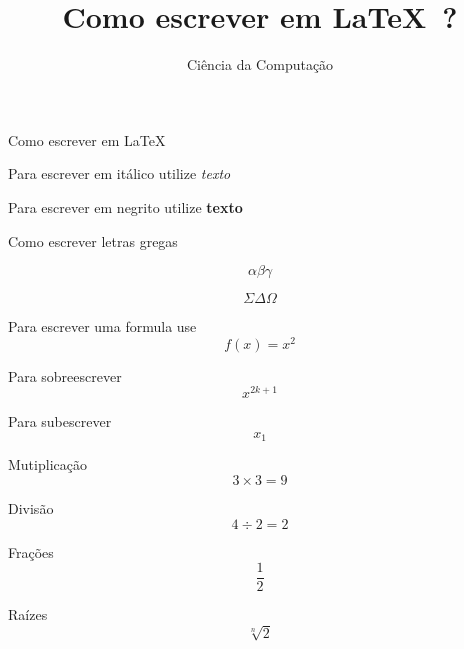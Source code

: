 \documentclass[a4paper,12pt]{article}
\title{Como escrever em \LaTeX\ ?}
\author{Ciência da Computação}
\date{}
\begin{document}
\maketitle

Como escrever em \LaTeX\ 

Para escrever em itálico utilize \textit {texto}

Para escrever em negrito utilize \textbf {texto}

Como escrever letras gregas

\[\alpha \beta \gamma \] 

\[ \Sigma \Delta \Omega \]

Para escrever uma formula use 
\[f(x)= x^2\]


Para sobreescrever   
\[x^{2k+1}\]

Para subescrever 
\[x_1\]

Mutiplicação 
\[3 \times 3 = 9\]

Divisão
 \[4 \div 2 = 2\]

Frações
\[\frac{1}{2}\]


Raízes
\[\sqrt [n] {2} \]
\end{document}
